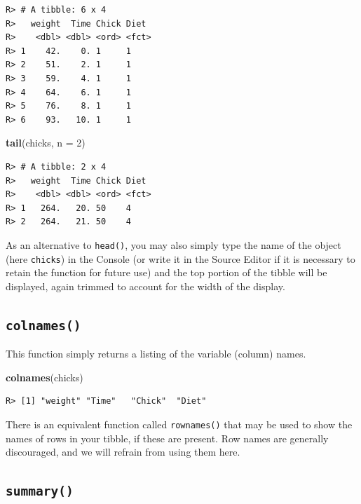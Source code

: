\documentclass[english,10pt,a4paper,oneside]{book}
\newenvironment{Shaded}{\begin{snugshade}}{\end{snugshade}}
\newcommand{\KeywordTok}[1]{\textcolor[rgb]{0.13,0.29,0.53}{\textbf{#1}}}
\newcommand{\DataTypeTok}[1]{\textcolor[rgb]{0.13,0.29,0.53}{#1}}
\newcommand{\DecValTok}[1]{\textcolor[rgb]{0.00,0.00,0.81}{#1}}
\newcommand{\NormalTok}[1]{#1}
\theoremstyle{definition}
\theoremstyle{definition}
\theoremstyle{definition}
\theoremstyle{remark}
\begin{document}
\begin{verbatim}
R> # A tibble: 6 x 4
R>   weight  Time Chick Diet 
R>    <dbl> <dbl> <ord> <fct>
R> 1    42.    0. 1     1    
R> 2    51.    2. 1     1    
R> 3    59.    4. 1     1    
R> 4    64.    6. 1     1    
R> 5    76.    8. 1     1    
R> 6    93.   10. 1     1
\end{verbatim}

\begin{Shaded}
\begin{Highlighting}[]
\KeywordTok{tail}\NormalTok{(chicks, }\DataTypeTok{n =} \DecValTok{2}\NormalTok{)}
\end{Highlighting}
\end{Shaded}

\begin{verbatim}
R> # A tibble: 2 x 4
R>   weight  Time Chick Diet 
R>    <dbl> <dbl> <ord> <fct>
R> 1   264.   20. 50    4    
R> 2   264.   21. 50    4
\end{verbatim}

As an alternative to \texttt{head()}, you may also simply type the name
of the object (here \texttt{chicks}) in the Console (or write it in the
Source Editor if it is necessary to retain the function for future use)
and the top portion of the tibble will be displayed, again trimmed to
account for the width of the display.

\subsection{\texorpdfstring{\texttt{colnames()}}{colnames()}}\label{colnames}

This function simply returns a listing of the variable (column) names.

\begin{Shaded}
\begin{Highlighting}[]
\KeywordTok{colnames}\NormalTok{(chicks)}
\end{Highlighting}
\end{Shaded}

\begin{verbatim}
R> [1] "weight" "Time"   "Chick"  "Diet"
\end{verbatim}

There is an equivalent function called \texttt{rownames()} that may be
used to show the names of rows in your tibble, if these are present. Row
names are generally discouraged, and we will refrain from using them
here.

\subsection{\texorpdfstring{\texttt{summary()}}{summary()}}\label{summary}
\end{document}
